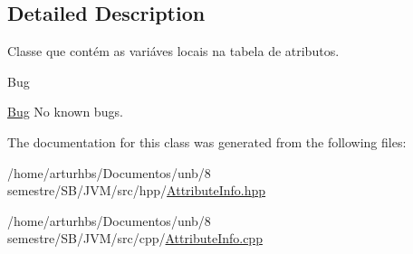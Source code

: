 \subsection{Detailed Description}
Classe que contém as variáves locais na tabela de atributos. 

\begin{DoxyRefDesc}{Bug}
\item[\hyperlink{bug__bug000012}{Bug}]No known bugs. \end{DoxyRefDesc}


The documentation for this class was generated from the following files\+:\begin{DoxyCompactItemize}
\item 
/home/arturhbs/\+Documentos/unb/8 semestre/\+S\+B/\+J\+V\+M/src/hpp/\hyperlink{AttributeInfo_8hpp}{Attribute\+Info.\+hpp}\item 
/home/arturhbs/\+Documentos/unb/8 semestre/\+S\+B/\+J\+V\+M/src/cpp/\hyperlink{AttributeInfo_8cpp}{Attribute\+Info.\+cpp}\end{DoxyCompactItemize}
